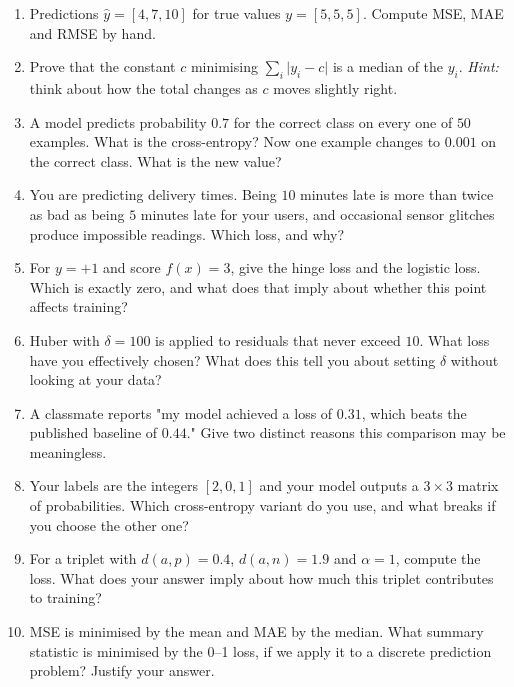 \documentclass[11pt]{article}
\begin{document}
\begin{enumerate}[leftmargin=*]
  \item Predictions $\hat y = [4, 7, 10]$ for true values $y = [5, 5, 5]$.
    Compute MSE, MAE and RMSE by hand.

  \item\label{q:median} Prove that the constant $c$ minimising
    $\sum_i \lvert y_i - c\rvert$ is a median of the $y_i$.
    \emph{Hint:} think about how the total changes as $c$ moves slightly right.

  \item A model predicts probability $0.7$ for the correct class on every one
    of $50$ examples. What is the cross-entropy? Now one example changes to
    $0.001$ on the correct class. What is the new value?

  \item You are predicting delivery times. Being $10$ minutes late is more than
    twice as bad as being $5$ minutes late for your users, and occasional
    sensor glitches produce impossible readings. Which loss, and why?

  \item For $y=+1$ and score $f(x) = 3$, give the hinge loss and the logistic
    loss. Which is exactly zero, and what does that imply about whether this
    point affects training?

  \item Huber with $\delta = 100$ is applied to residuals that never exceed
    $10$. What loss have you effectively chosen? What does this tell you about
    setting $\delta$ without looking at your data?

  \item A classmate reports "my model achieved a loss of $0.31$, which beats the
    published baseline of $0.44$." Give two distinct reasons this comparison
    may be meaningless.

  \item Your labels are the integers $[2, 0, 1]$ and your model outputs a
    $3\times 3$ matrix of probabilities. Which cross-entropy variant do you
    use, and what breaks if you choose the other one?

  \item For a triplet with $d(a,p) = 0.4$, $d(a,n) = 1.9$ and $\alpha = 1$,
    compute the loss. What does your answer imply about how much this triplet
    contributes to training?

  \item MSE is minimised by the mean and MAE by the median. What summary
    statistic is minimised by the 0--1 loss, if we apply it to a discrete
    prediction problem? Justify your answer.
\end{enumerate}
\end{document}
